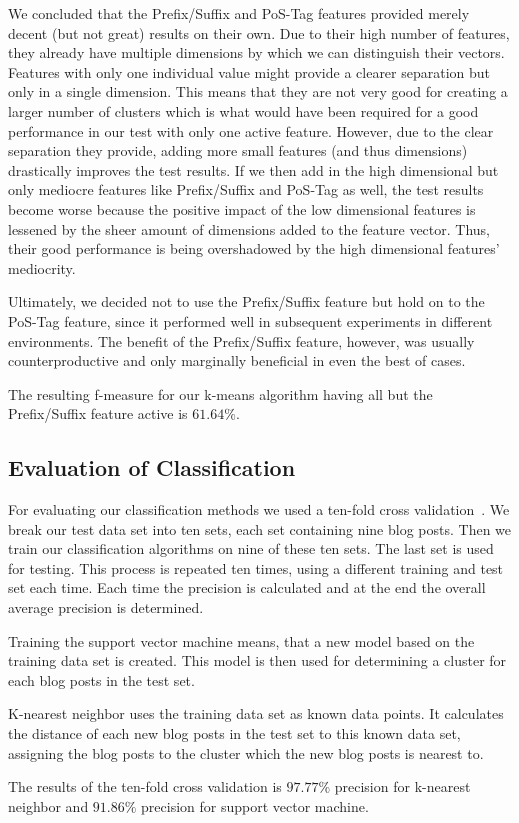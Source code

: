 We concluded that the Prefix/Suffix and PoS-Tag features provided merely decent (but not great) results on their own.
Due to their high number of features, they already have multiple dimensions by which we can distinguish their vectors.
Features with only one individual value might provide a clearer separation but only in a single dimension.
This means that they are not very good for creating a larger number of clusters which is what would have been required for a good performance in our test with only one active feature.
However, due to the clear separation they provide, adding more small features (and thus dimensions) drastically improves the test results.
If we then add in the high dimensional but only mediocre features like Prefix/Suffix and PoS-Tag as well, the test results become worse because the positive impact of the low dimensional features is lessened by the sheer amount of dimensions added to the feature vector.
Thus, their good performance is being overshadowed by the high dimensional features' mediocrity.


Ultimately, we decided not to use the Prefix/Suffix feature but hold on to the PoS-Tag feature, since it performed well in subsequent experiments in different environments.
The benefit of the Prefix/Suffix feature, however, was usually counterproductive and only marginally beneficial in even the best of cases.


The resulting f-measure for our k-means algorithm having all but the Prefix/Suffix feature active is $61.64\%$.


\subsection{Evaluation of Classification}
For evaluating our classification methods we used a ten-fold cross validation~\cite{kohavi1995study}.
We break our test data set into ten sets, each set containing nine blog posts.
Then we train our classification algorithms on nine of these ten sets.
The last set is used for testing.
This process is repeated ten times, using a different training and test set each time.
Each time the precision is calculated and at the end the overall average precision is determined.


Training the support vector machine means, that a new model based on the training data set is created.
This model is then used for determining a cluster for each blog posts in the test set.


K-nearest neighbor uses the training data set as known data points.
It calculates the distance of each new blog posts in the test set to this known data set, assigning the blog posts to the cluster which the new blog posts is nearest to.


The results of the ten-fold cross validation is $97.77\%$ precision for k-nearest neighbor and $91.86\%$ precision for support vector machine.
